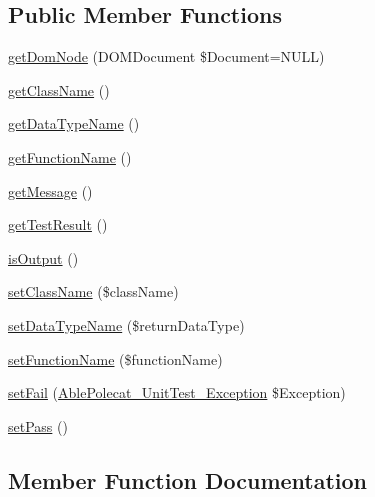 \subsection*{Public Member Functions}
\begin{DoxyCompactItemize}
\item 
\hyperlink{class_able_polecat___unit_test___result_a3241c66cb1cbb7b720be191808876012}{get\+Dom\+Node} (D\+O\+M\+Document \$Document=N\+U\+L\+L)
\item 
\hyperlink{class_able_polecat___unit_test___result_ab8f8ee56588ebf5091c288e44ebdfaf4}{get\+Class\+Name} ()
\item 
\hyperlink{class_able_polecat___unit_test___result_a421c174cc65a05486ea4659687808ff8}{get\+Data\+Type\+Name} ()
\item 
\hyperlink{class_able_polecat___unit_test___result_aa07f3ffd609a5269623ad54a64bf04d3}{get\+Function\+Name} ()
\item 
\hyperlink{class_able_polecat___unit_test___result_a0b0e611236742aac18ba1936d03ba89a}{get\+Message} ()
\item 
\hyperlink{class_able_polecat___unit_test___result_a4dea8388951eb7e76706838bf090a400}{get\+Test\+Result} ()
\item 
\hyperlink{class_able_polecat___unit_test___result_abb0f17d16c1ac7ab049a7e8dfc35fde2}{is\+Output} ()
\item 
\hyperlink{class_able_polecat___unit_test___result_aaf49e68e9856c8fc687f4a70febdbcb2}{set\+Class\+Name} (\$class\+Name)
\item 
\hyperlink{class_able_polecat___unit_test___result_a3b23db2045766e8ad1d9a1fdc2865cac}{set\+Data\+Type\+Name} (\$return\+Data\+Type)
\item 
\hyperlink{class_able_polecat___unit_test___result_a8b654a17e4a52e665f3916ab14c02945}{set\+Function\+Name} (\$function\+Name)
\item 
\hyperlink{class_able_polecat___unit_test___result_ab2838506be47781e65c544b6079c0d2a}{set\+Fail} (\hyperlink{class_able_polecat___unit_test___exception}{Able\+Polecat\+\_\+\+Unit\+Test\+\_\+\+Exception} \$Exception)
\item 
\hyperlink{class_able_polecat___unit_test___result_a73d4c4adb8e41947fceaef0bd012ef0d}{set\+Pass} ()
\end{DoxyCompactItemize}


\subsection{Member Function Documentation}
\hypertarget{class_able_polecat___unit_test___result_ab8f8ee56588ebf5091c288e44ebdfaf4}{}
